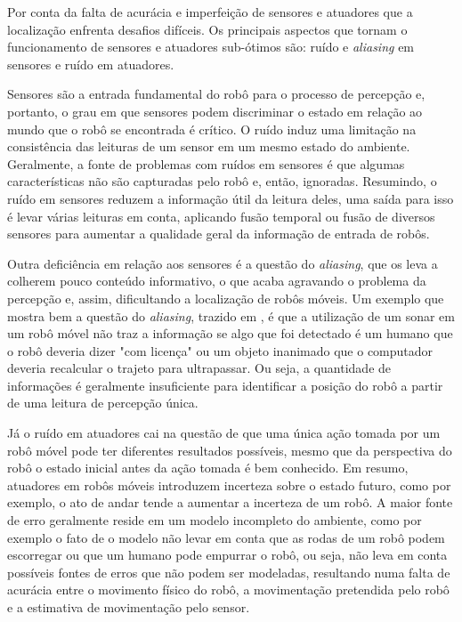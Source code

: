 \documentclass[acronym, symbols]{fei}
\begin{document}
			Por conta da falta de acurácia e imperfeição de sensores e atuadores que a localização enfrenta desafios difíceis. Os principais aspectos que tornam o funcionamento de sensores e atuadores sub-ótimos são: ruído e \textit{aliasing} em sensores e ruído em atuadores.
			
			Sensores são a entrada fundamental do robô para o processo de percepção	e, portanto, o grau em que sensores podem discriminar o estado em relação ao mundo que o robô se encontrada é crítico. O ruído induz uma limitação na consistência das leituras de um sensor em um mesmo estado do ambiente. Geralmente, a fonte de problemas com ruídos em sensores é que algumas características não são capturadas pelo robô e, então, ignoradas. Resumindo, o ruído em sensores reduzem a informação útil da leitura deles, uma saída para isso é levar várias leituras em conta, aplicando fusão temporal ou fusão de diversos sensores para aumentar a qualidade geral da informação de entrada de robôs.
			
			Outra deficiência em relação aos sensores é a questão do \textit{aliasing}, que os leva a colherem pouco conteúdo informativo, o que acaba agravando o problema da percepção e, assim, dificultando a localização de robôs móveis. Um exemplo que mostra bem a questão do \textit{aliasing}, trazido em \textcite{siegwart2011introduction}, é que a utilização de um sonar em um robô móvel não traz a informação se algo que foi detectado é um humano que o robô deveria dizer "com licença" ou um objeto inanimado que o computador deveria recalcular o trajeto para ultrapassar. Ou seja, a quantidade de informações é geralmente insuficiente para identificar a posição do robô a partir de uma leitura de percepção única.
			
			Já o ruído em atuadores cai na questão de que uma única ação tomada por um robô móvel pode ter diferentes resultados possíveis, mesmo que da perspectiva do robô o estado inicial antes da ação tomada é bem conhecido. Em resumo, atuadores em robôs móveis introduzem incerteza sobre o estado futuro, como por exemplo, o ato de andar tende a aumentar a incerteza de um robô. A maior fonte de erro geralmente reside em um modelo incompleto do ambiente, como por exemplo o fato de o modelo não levar em conta que as rodas de um robô podem escorregar ou que um humano pode empurrar o robô, ou seja, não leva em conta possíveis fontes de erros que não podem ser modeladas, resultando numa falta de acurácia entre o movimento físico do robô, a movimentação pretendida pelo robô e a estimativa de movimentação pelo sensor.
		
\end{document}
